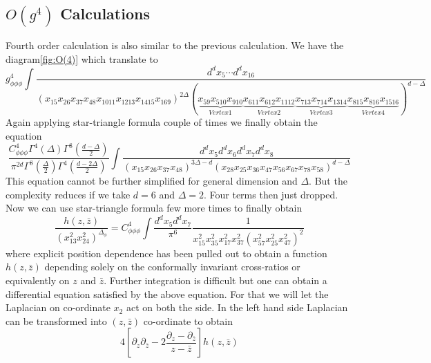 \documentclass[12pt,a4paper,oneside]{book}
\theoremstyle{definition}
\begin{document}
    \subsection{$O(g^4)$ Calculations}
        Fourth order calculation is also similar to the previous calculation. We have the diagram\ref{fig:O(4)} which translate to
        \footnotesize
        \begin{equation}
            g_{\phi\phi\phi}^{4}\int \frac{d^{d}x_5\cdots d^{d}x_{16}}{(x_{15}x_{26}x_{37}x_{48}x_{1011}x_{1213}x_{1415}x_{169})^{2\Delta}(\underbrace{x_{59}x_{510}x_{910}}_{Vertex 1}\underbrace{x_{611}x_{612}x_{1112}}_{Vertex 2}\underbrace{x_{713}x_{714}x_{1314}}_{Vertex 3}\underbrace{x_{815}x_{816}x_{1516}}_{Vertex 4})^{d-\Delta}}
        \end{equation}
        \normalsize
        Again applying star-triangle formula couple of times we finally obtain the equation
        \begin{equation}
           \frac{C_{\phi\phi\phi}^{4}\Gamma^{4}(\Delta)\Gamma^8(\frac{d-\Delta}{2})}{\pi^{2d}\Gamma^8(\frac{\Delta}{2})\Gamma^4(\frac{d-2\Delta}{2})} \int \frac{d^{d}x_5d^{d}x_6d^{d}x_7d^{d}x_8}{(x_{15}x_{26}x_{37}x_{48})^{3\Delta-d}(x_{28}x_{25}x_{36}x_{47}x_{56}x_{67}x_{78}x_{58})^{d-\Delta}}
        \end{equation}
        This equation cannot be further simplified for general dimension and $\Delta$. But the complexity reduces if we take $d=6$ and $\Delta = 2$. Four terms then just dropped. Now we can use star-triangle formula few more times to finally obtain 
        \begin{equation}
            \frac{h(z,\bar{z})}{(x_{13}^2x_{24}^2)^{\Delta_{\phi}}} = C_{\phi\phi\phi}^4 \int \frac{d^{d}x_5d^{d}x_7}{\pi^6} \frac{1}{x_{15}^2x_{35}^2x_{17}^2x_{37}^2(x_{57}^2x_{25}^2x_{47}^2)^2}
        \end{equation}
        where explicit position dependence has been pulled out to obtain a function $h(z,\bar{z})$ depending solely on the conformally invariant cross-ratios or equivalently on $z$ and $\bar{z}$. Further integration is difficult but one can obtain a differential equation satisfied by the above equation. For that we will let the Laplacian on co-ordinate $x_2$ act on both the side. In the left hand side Laplacian can be transformed into $(z,\bar{z})$ co-ordinate to obtain
        \begin{equation}
            4\left[\partial_z\partial_{\bar{z}} - 2\frac{\partial_z - \partial_{\bar{z}}}{z-\bar{z}}\right]h(z,\bar{z})
        \end{equation} 
\end{document}

